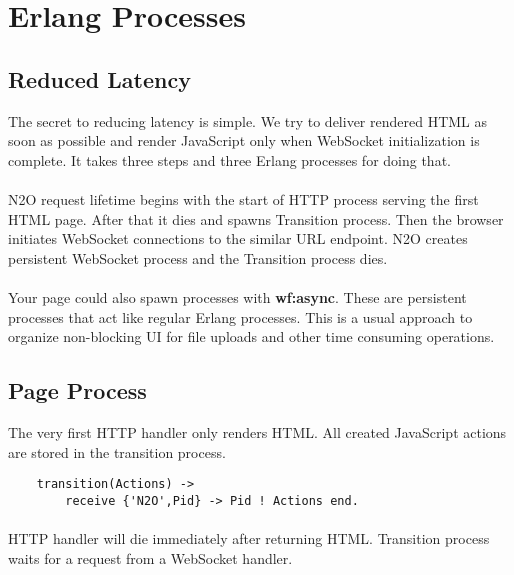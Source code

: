 \section{Erlang Processes}

\subsection{Reduced Latency}
The secret to reducing latency is simple. We try to deliver rendered HTML
as soon as possible and render JavaScript only when WebSocket initialization is complete.
It takes three steps and three Erlang processes for doing that.


\paragraph{}
N2O request lifetime begins with the start of HTTP process serving the first HTML page.
After that it dies and spawns Transition process.
Then the browser initiates WebSocket connections to the similar URL endpoint.
N2O creates persistent WebSocket process and the Transition process dies.

\paragraph{}
Your page could also spawn processes with {\bf wf:async}.
These are persistent processes that act like regular Erlang processes.
This is a usual approach to organize non-blocking UI for file uploads and other time consuming operations.

\newpage
\subsection{Page Process}
The very first HTTP handler only renders HTML. All created
JavaScript actions are stored in the transition process.

\begin{lstlisting}
    transition(Actions) ->
        receive {'N2O',Pid} -> Pid ! Actions end.
\end{lstlisting}

\paragraph{}
HTTP handler will die immediately after returning HTML. Transition process
waits for a request from a WebSocket handler.

